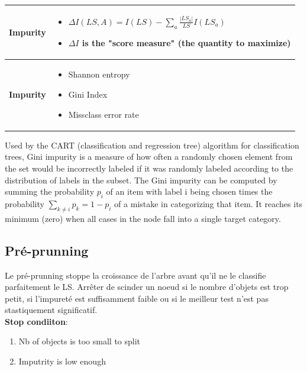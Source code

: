   \begin{table}[H]
    \begin{center}
    \begin{tabular}{| m{8em}| m{30em}|}
    \hline
    \centering
    \rowcolor{blue.g} \textbf{Impurity}     &  \begin{itemize}
                                                \item $\Delta I(LS,A) = I(LS) - \sum_a \frac{|LS_a|}{LS}I(LS_a)$
                                                \item $\Delta I$ is the "score measure" (the quantity to \textbf{maximize})
                                                \end{itemize} \\\hline    
    \centering
     \rowcolor{vert.g} \textbf{Impurity}     &  \begin{itemize}
                                                 \item Shannon entropy
                                                 \item Gini Index
                                                 \item Missclass error rate
                                            \end{itemize} \\\hline    
                                                                                
    \end{tabular}
    \end{center}
    \end{table}
    
Used by the CART (classification and regression tree) algorithm for classification trees, Gini impurity is a measure of how often a randomly chosen element from the set would be incorrectly labeled if it was randomly labeled according to the distribution of labels in the subset. The Gini impurity can be computed by summing the probability 
$p_{i}$ of an item with label 
i being chosen times the probability 
$\sum _{k\neq i}p_{k}=1-p_{i}$ of a mistake in categorizing that item. It reaches its minimum (zero) when all cases in the node fall into a single target category.

\subsection{Pré-prunning}
Le pré-prunning stoppe la croissance de l'arbre avant qu'il ne le classifie parfaitement le LS. Arrêter de scinder un noeud si le nombre d'objets est trop petit, si l'impureté est suffisamment faible ou si le meilleur test n'est pas stastiquement significatif.\\
\textbf{Stop condiiton}:
\begin{enumerate}
    \item Nb of objects is too small to split
    \item Imputrity is low enough
\end{enumerate}

